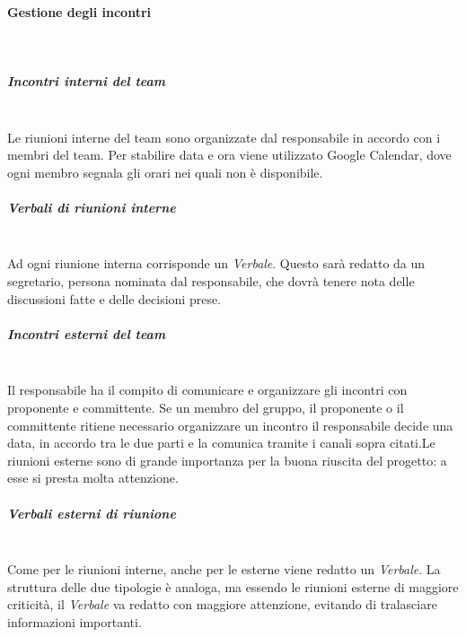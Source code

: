 			\paragraph{Gestione degli incontri} \mbox{}\\
			\subparagraph{Incontri interni del team} \mbox{}\\
			Le riunioni interne del team sono organizzate dal responsabile in accordo con i membri del team. Per stabilire data e ora viene utilizzato Google Calendar, dove ogni membro segnala gli orari nei quali non è disponibile.
			\subparagraph{Verbali di riunioni interne} \mbox{}\\
			Ad ogni riunione interna corrisponde un \textit{Verbale}. Questo sarà redatto da un segretario, persona nominata dal responsabile, che dovrà tenere nota delle discussioni fatte e delle decisioni prese. 
			\subparagraph{Incontri esterni del team} \mbox{}\\
			Il responsabile ha il compito di comunicare e organizzare gli incontri con  proponente e committente. Se un membro del gruppo, il proponente o il committente ritiene necessario organizzare un incontro il responsabile decide una data, in accordo tra le due parti e la comunica tramite i canali sopra citati.\newline Le riunioni esterne sono di grande importanza per la buona riuscita del progetto: a esse si presta molta attenzione.
			\subparagraph{Verbali esterni di riunione} \mbox{}\\
			Come per le riunioni interne, anche per le esterne viene redatto un \textit{Verbale}. La struttura delle due tipologie è analoga, ma essendo le riunioni esterne di maggiore criticità, il \textit{Verbale} va redatto con maggiore attenzione, evitando di tralasciare informazioni importanti.
